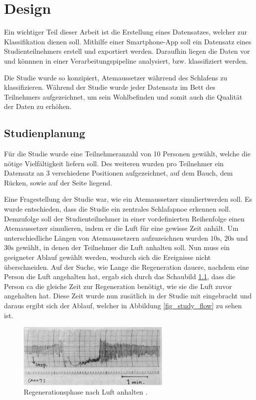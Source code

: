 \chapter{Design}
\label{ch:Design}

Ein wichtiger Teil dieser Arbeit ist die Erstellung eines Datensatzes, welcher zur Klassifikation dienen soll.
Mithilfe einer Smartphone-App soll ein Datensatz eines Studienteilnehmers erstell und exportiert werden. 
Daraufhin liegen die Daten vor und könnnen in einer Verarbeitungspipeline analysiert, bzw. klassifiziert werden.

Die Studie wurde so konzipiert, Atemaussetzer währrend des Schlafens zu klassifizieren. 
Während der Studie wurde jeder Datensatz im Bett des Teilnehmers aufgezeichnet, um sein Wohlbefinden und somit auch die Qualität der Daten zu erhöhen.

\section{Studienplanung}
Für die Studie wurde eine Teilnehmeranzahl von 10 Personen gewählt, welche die nötige Vielfältigkeit liefern soll.
Des weiteren wurden pro Teilnehmer ein Datensatz an 3 verschiedene Positionen aufgezeichnet, auf dem Bauch, dem Rücken, sowie auf der Seite liegend.

Eine Fragestellung der Studie war, wie ein Atemaussetzer \glqq simuliert\grqq werden soll. 
Es wurde entschieden, dass die Studie ein zentrales Schlafapnoe erkennen soll. 
Demzufolge soll der Studienteilnehmer in einer vordefinierten Reihenfolge einen Atemaussetzer \glqq simulieren\grqq, indem er die Luft für eine gewisse Zeit anhält.
Um unterschiedliche Längen von Atemaussetzern aufzuzeichnen wurden $10\si{\s}$, $20\si{\s}$ und $30\si{\s}$ gewählt, in denen der Teilnehmer die Luft anhalten soll. 
Nun muss ein geeigneter Ablauf gewählt werden, wodurch sich die Ereignisse nicht überschneiden.
Auf der Suche, wie Lange die Regeneration dauere, nachdem eine Person die Luft angehalten hat, ergab sich durch das Schaubild \ref{fig_respiration_regeneration}, 
dass die Person ca die gleiche Zeit zur Regeneration benötigt, wie sie die Luft zuvor angehalten hat.
Diese Zeit wurde nun zusätlich in der Studie mit eingebracht und daraus ergibt sich der Ablauf, welcher in Abbildung \ref{fig_study_flow} zu sehen ist.

\begin{figure}[ht]
    \centering
    \includegraphics[width=0.66\textwidth]{images/respiration/respiration_regeneration}
    \caption{Regenerationsphase nach Luft anhalten \cite{beath_rebreathing}.}
    \label{fig_respiration_regeneration}
\end{figure}

